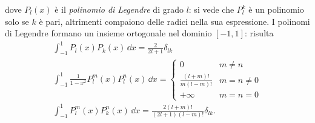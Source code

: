 dove $P_l(x)$ è il \emph{polinomio di Legendre} di grado $l$: si vede che $P_l^k$ è un polinomio solo se $k$ è pari, altrimenti compaiono delle radici nella sua espressione.
I polinomi di Legendre formano un insieme ortogonale nel dominio $[-1,1]$: risulta
\begin{equation}
	\begin{gathered}
		\int_{-1}^1P_l(x)P_k(x)\,\dd x=\frac{2}{2l+1}\delta_{lk}\\
		\int_{-1}^1\frac1{1-x^2}P_l^m(x)P_l^n(x)\,\dd x=
		\begin{cases}
			0						&m\ne n\\
			\frac{(l+m)!}{m(l-m)!}	&m=n\ne 0\\
			+\infty					&m=n=0
		\end{cases}\\
		\int_{-1}^1P_l^m(x)P_k^n(x)\,\dd x=\frac{2(l+m)!}{(2l+1)(l-m)!}\delta_{lk}.
	\end{gathered}
	\label{eq:ortogonalita-legendre}
\end{equation}

